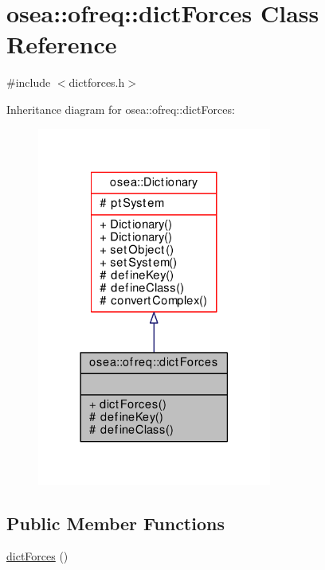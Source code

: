 \hypertarget{classosea_1_1ofreq_1_1dict_forces}{\section{osea\-:\-:ofreq\-:\-:dict\-Forces Class Reference}
\label{classosea_1_1ofreq_1_1dict_forces}
}


{\ttfamily \#include $<$dictforces.\-h$>$}



Inheritance diagram for osea\-:\-:ofreq\-:\-:dict\-Forces\-:
\nopagebreak
\begin{figure}[H]
\begin{center}
\leavevmode
\includegraphics[width=218pt]{classosea_1_1ofreq_1_1dict_forces__inherit__graph}
\end{center}
\end{figure}
\subsection*{Public Member Functions}
\begin{DoxyCompactItemize}
\item 
\hyperlink{classosea_1_1ofreq_1_1dict_forces_ae9af9b8247c5b69d3041167ff1f898c6}{dict\-Forces} ()
\end{DoxyCompactItemize}
